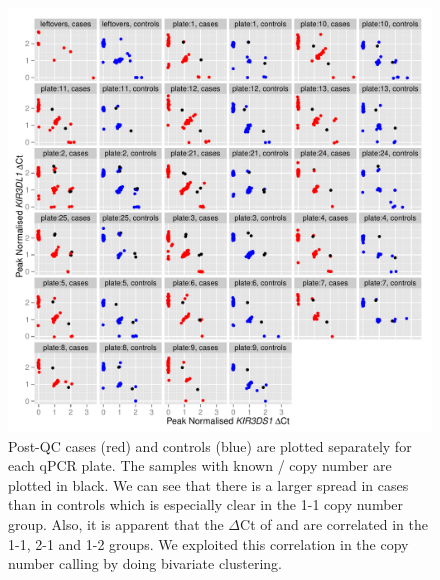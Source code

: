 \begin{figure}[h]
    \centering
        \includegraphics[scale=.9] {KIR/figures/Figure-S2.pdf}
        {Post-QC cases (red) and controls (blue) are plotted separately for each qPCR plate.}
        { The samples with known / copy number are plotted in black.
        We can see that there is a larger spread in cases than in controls which is especially clear in the 1-1 copy number group.
        Also, it is apparent that the $\Delta$Ct of  and  are correlated in the 1-1, 2-1 and 1-2 groups.
        We exploited this correlation in the copy number calling by doing bivariate clustering.  }
\end{figure}



